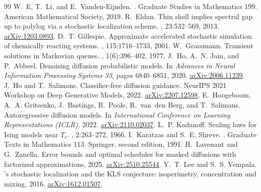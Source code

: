 \documentclass[10pt,a4paper]{amsart}
\numberwithin{equation}{section}
\begin{document}
\begin{thebibliography}{99}
 W.~E, T.~Li, and E.~Vanden-Eijnden. . \newblock Graduate Studies in Mathematics 199. American Mathematical Society, 2019.
 R.~Eldan. \newblock Thin shell implies spectral gap up to polylog via a stochastic localization scheme. , 23:532--569, 2013. \newblock \href{https://arxiv.org/abs/1203.0893}{arXiv:1203.0893}.
 D.~T. Gillespie. \newblock Approximate accelerated stochastic simulation of chemically reacting systems. , 115:1716--1733, 2001.
 W.~Grassmann. \newblock Transient solutions in {Markovian} queues. , 1(6):396--402, 1977.
 J.~Ho, A.~N. Jain, and P.~Abbeel. \newblock Denoising diffusion probabilistic models. \newblock In {\em Advances in Neural Information Processing Systems 33}, pages 6840--6851, 2020. \newblock \href{https://arxiv.org/abs/2006.11239}{arXiv:2006.11239}.
 J.~Ho and T.~Salimans. \newblock Classifier-free diffusion guidance. \newblock NeurIPS 2021 Workshop on Deep Generative Models, 2022. \newblock \href{https://arxiv.org/abs/2207.12598}{arXiv:2207.12598}.
 E.~Hoogeboom, A.~A. Gritsenko, J.~Bastings, B.~Poole, R.~van~den Berg, and T.~Salimans. \newblock Autoregressive diffusion models. \newblock In {\em International Conference on Learning Representations (ICLR)}, 2022. \newblock \href{https://arxiv.org/abs/2110.02037}{arXiv:2110.02037}.
 L.~P. Kadanoff. \newblock Scaling laws for {Ising} models near {$T_c$}. , 2:263--272, 1966.
 I.~Karatzas and S.~E. Shreve. . \newblock Graduate Texts in Mathematics 113. Springer, second edition, 1991.
 H.~Lavenant and G.~Zanella. \newblock Error bounds and optimal schedules for masked diffusions with factorized approximations, 2025. \newblock \href{https://arxiv.org/abs/2510.25544}{arXiv:2510.25544}.
 Y.~T. Lee and S.~S. Vempala. 's stochastic localization and the {KLS} conjecture: isoperimetry, concentration and mixing, 2016. \newblock \href{https://arxiv.org/abs/1612.01507}{arXiv:1612.01507}.

\end{thebibliography}
\end{document}
